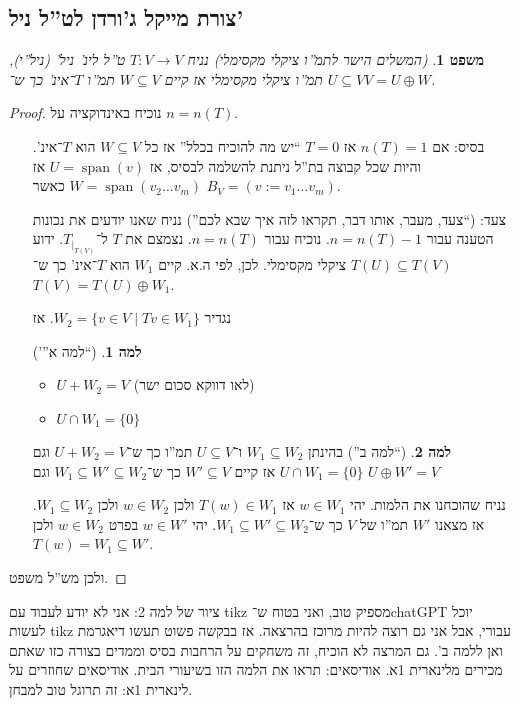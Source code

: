 \documentclass[]{article}
\DeclareMathOperator{\Sp}     {span}
\newcommand\co        {\colon}
\newtheorem{Theorem}{משפט}
\theoremstyle{definition}
\newtheorem{Lemma}{למה}
\newcommand\theo  [1] {\begin{Theorem}#1\end{Theorem}}
\newcommand\lem   [1] {\begin{Lemma}#1\end{Lemma}}
\begin{document}
    \subsection{צורת מייקל ג'ורדן לט''ל ניל'}
    \theo{(המשלים הישר לתמ''ו ציקלי מקסימלי) נניח $T \co V \to V$ ט''ל לינ' ניל' (ניל''י), $U \subseteq V$ תמ''ו ציקלי מקסימלי אז קיים $W \subseteq V$ תמ''ו $T$־אינ' כך ש־$V = U \oplus W$. }
    \begin{proof}
        נוכיח באינדוקציה על $n = n(T)$. 
        \begin{itemize}
            \item[בסיס: ]אם $n(T) = 1$ אז $T = 0$ ``יש מה להוכיח בכלל'' אז כל $W \subseteq V$ הוא $T$־אינ'. והיות שכל קבוצה בת''ל ניתנת להשלמה לבסיס, אז $U = \Sp(v)$ אז $W = \Sp(v_2 \dots v_m)$ כאשר $B_V = (v := v_1 \dots v_m)$. 
            \item[צעד: ](``צעד, מעבר, אותו דבר, תקראו לזה איך שבא לכם'') נניח שאנו יודעים את נכונות הטענה עבור $n = n(T) - 1$. נוכיח עבור $n = n(T)$. נצמצם את $T$ ל־$T_{|_{T(V)}}$. ידוע $T(U) \subseteq T(V)$ ציקלי מקסימלי. לכן, לפי ה.א. קיים $W_1$ הוא $T$־אינ' כך ש־$T(V) = T(U) \oplus W_1$. 
            
            נגדיר $W_2 = \{v \in V \mid Tv \in W_1\}$. אז \lem{(``למה א''')
                \begin{itemize}
                    \item $U + W_2 = V$ (לאו דווקא סכום ישר)
                    \item $U \cap W_1 = \{0\}$
                \end{itemize}
            }
            \lem{(``למה ב'') בהינתן $W_1 \subseteq W_2$ ו־$U \subseteq V$ תמ''ו כך ש־$U + W_2 = V$ וגם $U \cap W_1 = \{0\}$ אז קיים $W' \subseteq V$ כך ש־$W_1 \subseteq W' \subseteq W_2$ וגם $U \oplus W' = V$} 
            
            נניח שהוכחנו את הלמות. יהי $w \in W_1$ אז $T(w) \in W_1$ ולכן $w \in W_2$ ולכן $W_1 \subseteq W_2$.          
            אז מצאנו $W'$ תמ''ו של $V$ כך ש־$W_1 \subseteq W' \subseteq W_2$. יהי $w \in W'$ בפרט $w \in W_2$ ולכן $T(w) = W_1 \subseteq W'$. 
        \end{itemize}
        ולכן מש''ל משפט. 
    \end{proof}
    
    ציור של למה 2: אני לא יודע לעבוד עם tikz מספיק טוב, ואני בטוח ש־chatGPT יוכל לעשות tikz עבורי, אבל אני גם רוצה להיות מרוכז בהרצאה. אז בבקשה פשוט תעשו דיאגרמת ואן ללמה ב'. גם המרצה לא הוכיח, זה משחקים על הרחבות בסיס וממדים בצורה כזו שאתם מכירים מלינארית 1א. אודיסאים: תראו את הלמה הזו בשיעורי הבית. אודיסאים שחוזרים על לינארית 1א: זה תרוגל טוב למבחן. 
    
\end{document}
